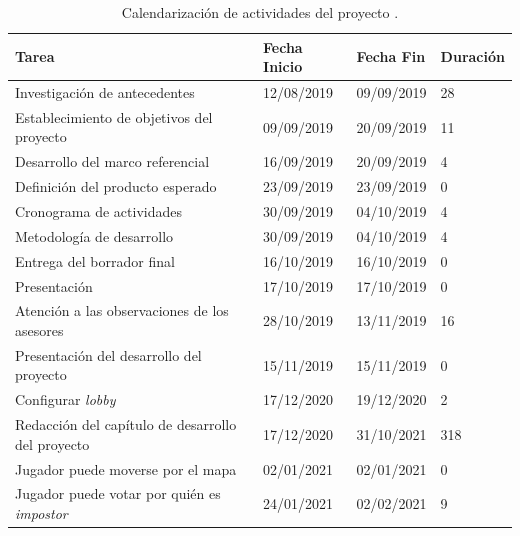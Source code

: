 \begin{longtable}[c]{m{} m{} m{} m{}}
\caption{Calendarización de actividades del proyecto \label{table:fechas_actividades}.} \\
\linespread{0.5}\selectfont\centering
\renewcommand{\arraystretch}{0.75}
 
        Tarea & Fecha Inicio & Fecha Fin & Duración \\ \hline
        Investigación de antecedentes & 12/08/2019 & 09/09/2019 & 28 \\ 
        Establecimiento de objetivos del proyecto & 09/09/2019 & 20/09/2019 & 11 \\ 
        Desarrollo del marco referencial & 16/09/2019 & 20/09/2019 & 4 \\ 
        Definición del producto esperado & 23/09/2019 & 23/09/2019 & 0 \\ 
        Cronograma de actividades & 30/09/2019 & 04/10/2019 & 4 \\
        Metodología de desarrollo & 30/09/2019 & 04/10/2019 & 4 \\
        Entrega del borrador final & 16/10/2019 & 16/10/2019 & 0 \\
        Presentación & 17/10/2019 & 17/10/2019 & 0 \\ 
        Atención a las observaciones de los asesores & 28/10/2019 & 13/11/2019 & 16 \\  
        Presentación del desarrollo del proyecto & 15/11/2019 & 15/11/2019 & 0 \\  
        Configurar \textit{lobby} & 17/12/2020 & 19/12/2020 & 2 \\  
        Redacción del capítulo de desarrollo del proyecto & 17/12/2020 & 31/10/2021 & 318 \\  
        Jugador puede moverse por el mapa & 02/01/2021 & 02/01/2021 & 0 \\  
        Jugador puede votar por quién es \textit{impostor} & 24/01/2021 & 02/02/2021 & 9 \\  

\end{longtable}

